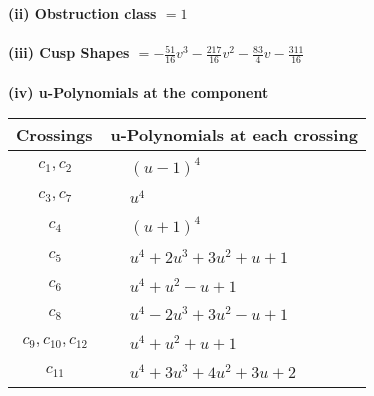 \documentclass[1p]{elsarticle_modified}
\theoremstyle{definition}
\begin{document}
\flushleft \textbf{(ii) Obstruction class $= 1$}\\~\\
\flushleft \textbf{(iii) Cusp Shapes $= -\frac{51}{16} v^3-\frac{217}{16} v^2-\frac{83}{4} v-\frac{311}{16}$}\\~\\
\newpage\renewcommand{\arraystretch}{1}
\flushleft \textbf{(iv) u-Polynomials at the component}\newline \\
\begin{tabular}{m{50pt}|m{274pt}}
Crossings & \hspace{64pt}u-Polynomials at each crossing \\
\hline $$\begin{aligned}c_{1},c_{2}\end{aligned}$$&$\begin{aligned}
&(u-1)^4
\end{aligned}$\\
\hline $$\begin{aligned}c_{3},c_{7}\end{aligned}$$&$\begin{aligned}
&u^4
\end{aligned}$\\
\hline $$\begin{aligned}c_{4}\end{aligned}$$&$\begin{aligned}
&(u+1)^4
\end{aligned}$\\
\hline $$\begin{aligned}c_{5}\end{aligned}$$&$\begin{aligned}
&u^4+2 u^3+3 u^2+u+1
\end{aligned}$\\
\hline $$\begin{aligned}c_{6}\end{aligned}$$&$\begin{aligned}
&u^4+u^2- u+1
\end{aligned}$\\
\hline $$\begin{aligned}c_{8}\end{aligned}$$&$\begin{aligned}
&u^4-2 u^3+3 u^2- u+1
\end{aligned}$\\
\hline $$\begin{aligned}c_{9},c_{10},c_{12}\end{aligned}$$&$\begin{aligned}
&u^4+u^2+u+1
\end{aligned}$\\
\hline $$\begin{aligned}c_{11}\end{aligned}$$&$\begin{aligned}
&u^4+3 u^3+4 u^2+3 u+2
\end{aligned}$\\
\hline
\end{tabular}\\~\\
\end{document}
